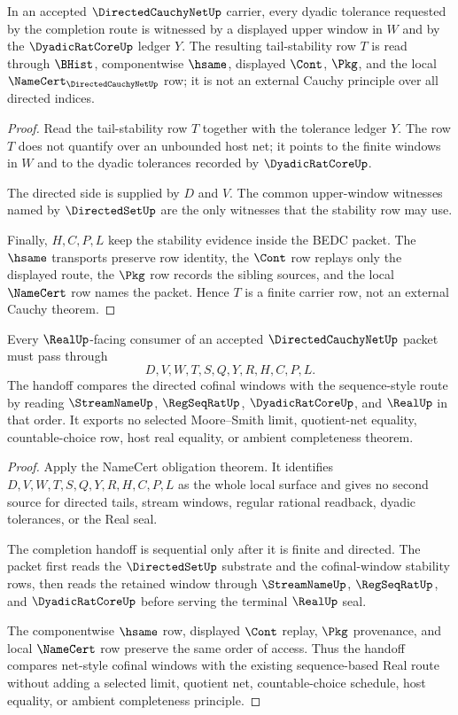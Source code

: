 \begin{theorem}
\label{thm:directed-cauchy-net-tail-stability}
In an accepted $\DirectedCauchyNetUp$ carrier, every dyadic tolerance requested by the completion route is witnessed by a displayed upper window in $W$ and by the $\DyadicRatCoreUp$ ledger $Y$. The resulting tail-stability row $T$ is read through $\BHist$, componentwise $\hsame$, displayed $\Cont$, $\Pkg$, and the local $\NameCert_{\DirectedCauchyNetUp}$ row; it is not an external Cauchy principle over all directed indices.
\end{theorem}
\begin{proof}
Read the tail-stability row $T$ together with the tolerance ledger $Y$. The row $T$ does not quantify over an unbounded host net; it points to the finite windows in $W$ and to the dyadic tolerances recorded by $\DyadicRatCoreUp$.

The directed side is supplied by $D$ and $V$. The common upper-window witnesses named by $\DirectedSetUp$ are the only witnesses that the stability row may use.

Finally, $H,C,P,L$ keep the stability evidence inside the BEDC packet. The $\hsame$ transports preserve row identity, the $\Cont$ row replays only the displayed route, the $\Pkg$ row records the sibling sources, and the local $\NameCert$ row names the packet. Hence $T$ is a finite carrier row, not an external Cauchy theorem.
\end{proof}

\begin{theorem}
\label{thm:directed-cauchy-net-real-completion-handoff}
Every $\RealUp$-facing consumer of an accepted $\DirectedCauchyNetUp$ packet must pass through
$$
D,V,W,T,S,Q,Y,R,H,C,P,L .
$$
The handoff compares the directed cofinal windows with the sequence-style route by reading $\StreamNameUp$, $\RegSeqRatUp$, $\DyadicRatCoreUp$, and $\RealUp$ in that order. It exports no selected Moore--Smith limit, quotient-net equality, countable-choice row, host real equality, or ambient completeness theorem.
\end{theorem}
\begin{proof}
Apply the NameCert obligation theorem. It identifies $D,V,W,T,S,Q,Y,R,H,C,P,L$ as the whole local surface and gives no second source for directed tails, stream windows, regular rational readback, dyadic tolerances, or the Real seal.

The completion handoff is sequential only after it is finite and directed. The packet first reads the $\DirectedSetUp$ substrate and the cofinal-window stability rows, then reads the retained window through $\StreamNameUp$, $\RegSeqRatUp$, and $\DyadicRatCoreUp$ before serving the terminal $\RealUp$ seal.

The componentwise $\hsame$ row, displayed $\Cont$ replay, $\Pkg$ provenance, and local $\NameCert$ row preserve the same order of access. Thus the handoff compares net-style cofinal windows with the existing sequence-based Real route without adding a selected limit, quotient net, countable-choice schedule, host equality, or ambient completeness principle.
\end{proof}

